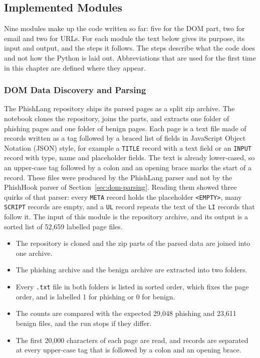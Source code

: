\documentclass{FastFyp}
\begin{document}
\subsection{Implemented Modules}
\label{sec:impl-modules}
Nine modules make up the code written so far: five for the DOM part, two for email and two for URLs. For each module the text below gives its purpose, its input and output, and the steps it follows. The steps describe what the code does and not how the Python is laid out. Abbreviations that are used for the first time in this chapter are defined where they appear.

\subsubsection{DOM Data Discovery and Parsing}
\label{sec:impl-dom-data}
The PhishLang repository ships its parsed pages as a split zip archive. The notebook clones the repository, joins the parts, and extracts one folder of phishing pages and one folder of benign pages. Each page is a text file made of records written as a tag followed by a braced list of fields in JavaScript Object Notation (JSON) style, for example a \texttt{TITLE} record with a text field or an \texttt{INPUT} record with type, name and placeholder fields. The text is already lower-cased, so an upper-case tag followed by a colon and an opening brace marks the start of a record. These files were produced by the PhishLang parser and not by the PhishHook parser of Section~\ref{sec:dom-parsing}. Reading them showed three quirks of that parser: every \texttt{META} record holds the placeholder \texttt{<EMPTY>}, many \texttt{SCRIPT} records are empty, and a \texttt{UL} record repeats the text of the \texttt{LI} records that follow it. The input of this module is the repository archive, and its output is a sorted list of 52,659 labelled page files.
\begin{itemize}
	\item The repository is cloned and the zip parts of the parsed data are joined into one archive.
	\item The phishing archive and the benign archive are extracted into two folders.
	\item Every \texttt{.txt} file in both folders is listed in sorted order, which fixes the page order, and is labelled 1 for phishing or 0 for benign.
	\item The counts are compared with the expected 29,048 phishing and 23,611 benign files, and the run stops if they differ.
	\item The first 20,000 characters of each page are read, and records are separated at every upper-case tag that is followed by a colon and an opening brace.
\end{itemize}
\end{document}
